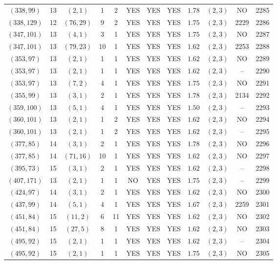\begin{longtable}{|c|c|c|c|c|c|c|c|c|c|c|c|}
$(338,99)$ & 13 & $(2,1)$ & 1 & 2 & YES & YES & YES & $1.78$ & $(2,3)$ & NO & 2285\\
$(338,129)$ & 12 & $(76,29)$ & 9 & 2 & YES & YES & YES & $1.75$ & $(2,3)$ & 2229 & 2286\\
$(347,101)$ & 13 & $(4,1)$ & 3 & 1 & YES & YES & YES & $1.75$ & $(2,3)$ & NO & 2287\\
$(347,101)$ & 13 & $(79,23)$ & 10 & 1 & YES & YES & YES & $1.62$ & $(2,3)$ & 2253 & 2288\\
$(353,97)$ & 13 & $(2,1)$ & 1 & 1 & YES & YES & YES & $1.62$ & $(2,3)$ & NO & 2289\\
$(353,97)$ & 13 & $(2,1)$ & 1 & 1 & YES & YES & YES & $1.62$ & $(2,3)$ & -- & 2290\\
$(353,97)$ & 13 & $(7,2)$ & 4 & 1 & YES & YES & YES & $1.75$ & $(2,3)$ & NO & 2291\\
$(355,99)$ & 13 & $(3,1)$ & 2 & 1 & YES & YES & YES & $1.78$ & $(2,3)$ & 2134 & 2292\\
$(359,100)$ & 13 & $(5,1)$ & 4 & 1 & YES & YES & YES & $1.50$ & $(2,3)$ & -- & 2293\\
$(360,101)$ & 13 & $(2,1)$ & 1 & 2 & YES & YES & YES & $1.62$ & $(2,3)$ & NO & 2294\\
$(360,101)$ & 13 & $(2,1)$ & 1 & 2 & YES & YES & YES & $1.62$ & $(2,3)$ & -- & 2295\\
$(377,85)$ & 14 & $(3,1)$ & 2 & 1 & YES & YES & YES & $1.78$ & $(2,3)$ & NO & 2296\\
$(377,85)$ & 14 & $(71,16)$ & 10 & 1 & YES & YES & YES & $1.62$ & $(2,3)$ & NO & 2297\\
$(395,73)$ & 15 & $(3,1)$ & 2 & 1 & YES & YES & YES & $1.62$ & $(2,3)$ & -- & 2298\\
$(407,171)$ & 13 & $(2,1)$ & 1 & 1 & NO & YES & YES & $1.75$ & $(2,3)$ & -- & 2299\\
$(424,97)$ & 14 & $(3,1)$ & 2 & 1 & YES & YES & YES & $1.62$ & $(2,3)$ & NO & 2300\\
$(437,99)$ & 14 & $(5,1)$ & 4 & 1 & YES & YES & YES & $1.67$ & $(2,3)$ & 2259 & 2301\\
$(451,84)$ & 15 & $(11,2)$ & 6 & 11 & YES & YES & YES & $1.62$ & $(2,3)$ & NO & 2302\\
$(451,84)$ & 15 & $(27,5)$ & 8 & 1 & YES & YES & YES & $1.62$ & $(2,3)$ & NO & 2303\\
$(495,92)$ & 15 & $(2,1)$ & 1 & 1 & YES & YES & YES & $1.62$ & $(2,3)$ & -- & 2304\\
$(495,92)$ & 15 & $(2,1)$ & 1 & 1 & YES & YES & YES & $1.75$ & $(2,3)$ & NO & 2305\\

\end{longtable}
